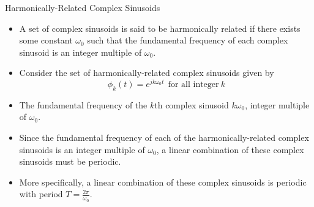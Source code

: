 \begin{frame}{Harmonically-Related Complex Sinusoids}
\begin{itemize}
\item A set of complex sinusoids is said to be {\color{red}harmonically related} if there exists some constant $\omega_0$ such that the fundamental frequency of each complex sinusoid is an integer multiple of
$\omega_0$.
\item Consider the set of harmonically-related complex sinusoids given by
\[\boxed{\phi_k(t)=e^{jk\omega_0t}}~~\text{for all integer}~k\]
\item The fundamental frequency of the $k$th complex sinusoid $k\omega_0$, integer multiple of $\omega_0$.
\item Since the fundamental frequency of each of the harmonically-related complex sinusoids is an integer multiple of $\omega_0$, a linear combination of these complex sinusoids must be periodic.
\item More specifically, a linear combination of these complex sinusoids is periodic with period $T=\frac{2\pi}{\omega_0}$.
\end{itemize}
\end{frame}


